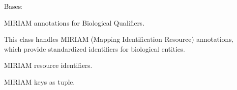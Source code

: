 \documentclass[letterpaper,12pt,english]{sphinxmanual}
\begin{document}

\begin{fulllineitems}
\label{\detokenize{api/core:cbmpy.CBCommon.MIRIAMannotation}}
\pysigstartsignatures
\pysigline
{}
\pysigstopsignatures
\sphinxAtStartPar
Bases: 

\sphinxAtStartPar
MIRIAM annotations for Biological Qualifiers.

\sphinxAtStartPar
This class handles MIRIAM (Mapping Identification Resource) annotations,
which provide standardized identifiers for biological entities.

\begin{fulllineitems}
\label{\detokenize{api/core:cbmpy.CBCommon.MIRIAMannotation.MIRIAM}}
\pysigstartsignatures
\pysigline
{}
\pysigstopsignatures
\sphinxAtStartPar
MIRIAM resource identifiers.
\begin{quote}\begin{description}
\sphinxAtStartPar
{}

\end{description}\end{quote}

\end{fulllineitems}


\begin{fulllineitems}
\label{\detokenize{api/core:cbmpy.CBCommon.MIRIAMannotation.MIDS}}
\pysigstartsignatures
\pysigline
{}
\pysigstopsignatures
\sphinxAtStartPar
MIRIAM keys as tuple.
\begin{quote}\begin{description}
\sphinxAtStartPar
{}


\end{description}
\end{quote}
\end{fulllineitems}
\end{fulllineitems}
\end{document}
